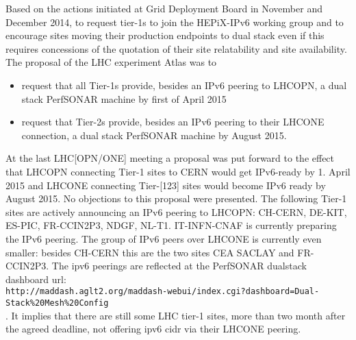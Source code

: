 Based on the actions initiated at Grid Deployment Board in November and December 2014, to request tier-1s to join the HEPiX-IPv6 working group and to encourage sites moving their production endpoints to dual stack even if this requires concessions of the quotation of their site relatability and site availability. The proposal of the LHC experiment Atlas was to
\begin{itemize}
 \item request that all Tier-1s provide,
	besides an IPv6 peering to LHCOPN,
        a dual stack PerfSONAR machine by first of April 2015
 \item request that Tier-2s provide,
        besides an IPv6 peering to their LHCONE connection,
        a dual stack PerfSONAR machine by August 2015.
\end{itemize}
At the last LHC[OPN/ONE] meeting a proposal was put forward to the effect that
LHCOPN connecting Tier-1 sites to CERN would get IPv6-ready by 1. April 2015 and
LHCONE connecting Tier-[123] sites would become IPv6 ready by August 2015.
No objections to this proposal were presented. The following Tier-1 sites are actively announcing an IPv6 peering to LHCOPN: CH-CERN, DE-KIT, ES-PIC, FR-CCIN2P3, NDGF, NL-T1. IT-INFN-CNAF is currently preparing the IPv6 peering. The group of IPv6 peers over LHCONE is currently even smaller: besides CH-CERN this are the two sites CEA SACLAY and FR-CCIN2P3.
The ipv6 peerings are reflected at the PerfSONAR dualstack dashboard url:\\
{\tt\small http://maddash.aglt2.org/maddash-webui/index.cgi?dashboard=Dual-Stack\%20Mesh\%20Config}\\. It implies that there are still some LHC tier-1 sites, more than two month after the agreed deadline, not offering ipv6 cidr via their LHCONE peering.
